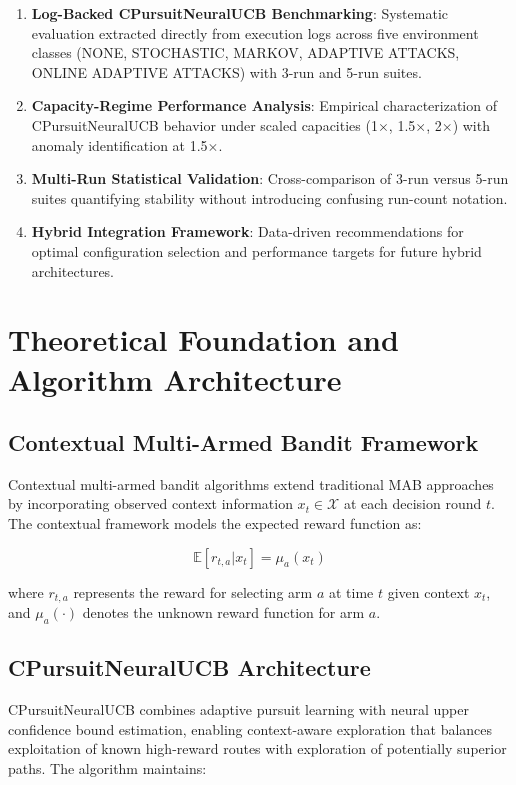 \documentclass[12pt,a4paper]{article}
\begin{document}
\begin{enumerate}
\item \textbf{Log-Backed CPursuitNeuralUCB Benchmarking}: Systematic evaluation extracted directly from execution logs across five environment classes (NONE, STOCHASTIC, MARKOV, ADAPTIVE ATTACKS, ONLINE ADAPTIVE ATTACKS) with 3-run and 5-run suites.
\item \textbf{Capacity-Regime Performance Analysis}: Empirical characterization of CPursuitNeuralUCB behavior under scaled capacities (1$\times$, 1.5$\times$, 2$\times$) with anomaly identification at 1.5$\times$.
\item \textbf{Multi-Run Statistical Validation}: Cross-comparison of 3-run versus 5-run suites quantifying stability without introducing confusing run-count notation.
\item \textbf{Hybrid Integration Framework}: Data-driven recommendations for optimal configuration selection and performance targets for future hybrid architectures.
\end{enumerate}

\newpage
\section{Theoretical Foundation and Algorithm Architecture}

\subsection{Contextual Multi-Armed Bandit Framework}

Contextual multi-armed bandit algorithms extend traditional MAB approaches by incorporating observed context information $x_t \in \mathcal{X}$ at each decision round $t$. The contextual framework models the expected reward function as:

\begin{equation}
\mathbb{E}[r_{t,a} | x_t] = \mu_a(x_t)
\end{equation}

where $r_{t,a}$ represents the reward for selecting arm $a$ at time $t$ given context $x_t$, and $\mu_a(\cdot)$ denotes the unknown reward function for arm $a$.

\subsection{CPursuitNeuralUCB Architecture}

CPursuitNeuralUCB combines adaptive pursuit learning with neural upper confidence bound estimation, enabling context-aware exploration that balances exploitation of known high-reward routes with exploration of potentially superior paths. The algorithm maintains:
\end{document}
